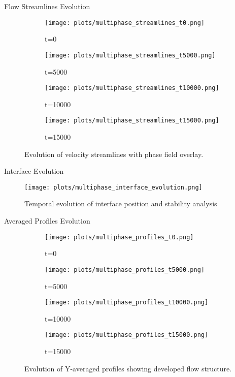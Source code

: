 \documentclass{beamer}
\begin{document}
\begin{frame}{Flow Streamlines Evolution}
  \begin{figure}
    \begin{subfigure}[b]{0.48\textwidth}
      \texttt{[image: plots/multiphase\_streamlines\_t0.png]}
      \caption{t=0}
    \end{subfigure}
    \hfill
    \begin{subfigure}[b]{0.48\textwidth}
      \texttt{[image: plots/multiphase\_streamlines\_t5000.png]}
      \caption{t=5000}
    \end{subfigure}
    \vfill
    \begin{subfigure}[b]{0.48\textwidth}
      \texttt{[image: plots/multiphase\_streamlines\_t10000.png]}
      \caption{t=10000}
    \end{subfigure}
    \hfill
    \begin{subfigure}[b]{0.48\textwidth}
      \texttt{[image: plots/multiphase\_streamlines\_t15000.png]}
      \caption{t=15000}
    \end{subfigure}
    \caption{Evolution of velocity streamlines with phase field overlay.}
  \end{figure}
\end{frame}

\begin{frame}{Interface Evolution}
  \begin{figure}
    \texttt{[image: plots/multiphase\_interface\_evolution.png]}
    \caption{Temporal evolution of interface position and stability analysis}
  \end{figure}
\end{frame}

\begin{frame}{Averaged Profiles Evolution}
  \begin{figure}
    \begin{subfigure}[b]{0.48\textwidth}
      \texttt{[image: plots/multiphase\_profiles\_t0.png]}
      \caption{t=0}
    \end{subfigure}
    \hfill
    \begin{subfigure}[b]{0.48\textwidth}
      \texttt{[image: plots/multiphase\_profiles\_t5000.png]}
      \caption{t=5000}
    \end{subfigure}
    \vfill
    \begin{subfigure}[b]{0.48\textwidth}
      \texttt{[image: plots/multiphase\_profiles\_t10000.png]}
      \caption{t=10000}
    \end{subfigure}
    \hfill
    \begin{subfigure}[b]{0.48\textwidth}
      \texttt{[image: plots/multiphase\_profiles\_t15000.png]}
      \caption{t=15000}
    \end{subfigure}
    \caption{Evolution of Y-averaged profiles showing developed flow structure.}
  \end{figure}
\end{frame}
\end{document}

